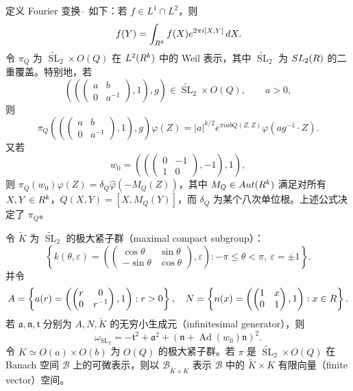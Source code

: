 定义 Fourier 变换 $\widehat{\ }$ 如下：若 $f\in L^1\cap L^2$，则
\[
 f(Y)=\int_{R^k}f(X)e^{2\pi i[X,Y]}\,dX.
\]
令 $\pi_Q$ 为 $\widetilde{\operatorname{SL}}_2\times O(Q)$ 在 $L^2(R^k)$ 中的 Weil 表示，其中 $\widetilde{\operatorname{SL}}_2$ 为 $SL_2(R)$ 的二重覆盖。特别地，若
\[
 \left(\left(\begin{pmatrix}a&b\\0&a^{-1}\end{pmatrix},1\right),g\right)
 \in\widetilde{\operatorname{SL}}_2\times O(Q),\qquad a>0,
\]
则
\[
 \pi_Q\!\left(\left(\begin{pmatrix}a&b\\0&a^{-1}\end{pmatrix},1\right),g\right)\varphi(Z)
 =|a|^{k/2}e^{\pi iabQ(Z,Z)}\varphi(ag^{-1}\cdot Z).
\]
又若
\[
 w_0=\left(\left(\begin{pmatrix}0&-1\\1&0\end{pmatrix},-1\right),1\right),
\]
则 $\pi_Q(w_0)\varphi(Z)=\delta_Q\widehat\varphi(-M_Q(Z))$，其中 $M_Q\in Aut(R^k)$ 满足对所有 $X,Y\in R^k$，$Q(X,Y)=[X,M_Q(Y)]$，而 $\delta_Q$ 为某个八次单位根。上述公式决定了 $\pi_Q$。

令 $\widetilde K$ 为 $\widetilde{\operatorname{SL}}_2$ 的极大紧子群（maximal compact subgroup）：
\[
 \left\{k(\theta,\varepsilon)=
 \left(\begin{pmatrix}\cos\theta&\sin\theta\\-\sin\theta&\cos\theta\end{pmatrix},\varepsilon\right)
 :-\pi\le\theta<\pi,\ \varepsilon=\pm1\right\}.
\]
并令
\[
 A=\left\{a(r)=\left(\begin{pmatrix}r&0\\0&r^{-1}\end{pmatrix},1\right):r>0\right\},
\quad
 N=\left\{n(x)=\left(\begin{pmatrix}1&x\\0&1\end{pmatrix},1\right):x\in R\right\}.
\]
若 $\mathfrak a,\mathfrak n,\mathfrak t$ 分别为 $A,N,\widetilde K$ 的无穷小生成元（infinitesimal generator），则
\[
 \omega_{\operatorname{SL}_2}=-\mathfrak t^2+\mathfrak a^2+
 (\mathfrak n+\operatorname{Ad}(w_0)\mathfrak n)^2.
\]
令 $K\simeq O(a)\times O(b)$ 为 $O(Q)$ 的极大紧子群。若 $\pi$ 是 $\widetilde{\operatorname{SL}}_2\times O(Q)$ 在 Banach 空间 $\mathcal B$ 上的可微表示，则以 $\mathcal B_{\widetilde K\times K}$ 表示 $\mathcal B$ 中的 $\widetilde K\times K$ 有限向量（finite vector）空间。

